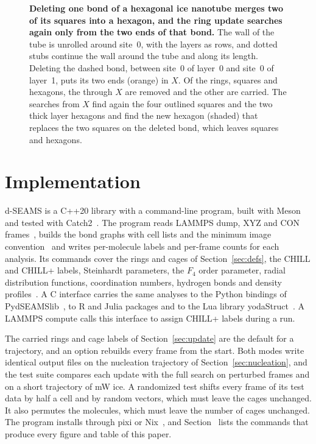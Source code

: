 \documentclass[preprint,12pt]{elsarticle}
\begin{document}
\begin{figure}[tbp]
\centering

\caption{\textbf{Deleting one bond of a hexagonal ice nanotube merges two of its squares into a hexagon, and the ring update searches again only from the two ends of that bond.}
The wall of the tube is unrolled around site~0, with the layers as rows, and dotted stubs continue the wall around the tube and along its length.
Deleting the dashed bond, between site~0 of layer~0 and site~0 of layer~1, puts its two ends (orange) in $X$.
Of the  rings,  squares and  hexagons, the  through $X$ are removed and the other  are carried.
The searches from $X$ find again the four outlined squares and the two thick layer hexagons and find the new hexagon (shaded) that replaces the two squares on the deleted bond, which leaves  squares and  hexagons.}
\label{fig:update}
\end{figure}

\section{Implementation}
\label{sec:impl}

d-SEAMS is a C++20 library with a command-line program, built with Meson~\cite{meson} and tested with Catch2~\cite{catch2}.
The program reads LAMMPS dump, XYZ and CON frames~\cite{thompson2022lammps}, builds the bond graphs with cell lists and the minimum image convention~\cite{goswami2026linkcell,goswami2026minimage} and writes per-molecule labels and per-frame counts for each analysis.
Its commands cover the rings and cages of Section~\ref{sec:defs}, the CHILL and CHILL+ labels, Steinhardt parameters, the $F_4$ order parameter, radial distribution functions, coordination numbers, hydrogen bonds and density profiles~\cite{steinhardt1983bond,moore2010chill,nguyen2015identification,rodger1996f4}.
A C interface carries the same analyses to the Python bindings of PydSEAMSlib~\cite{pydseamslib2026}, to R and Julia packages and to the Lua library yodaStruct~\cite{yodastruct2026}.
A LAMMPS compute calls this interface to assign CHILL+ labels during a run.

The carried rings and cage labels of Section~\ref{sec:update} are the default for a trajectory, and an option rebuilds every frame from the start.
Both modes write identical output files on the nucleation trajectory of Section~\ref{sec:nucleation}, and the test suite compares each update with the full search on perturbed frames and on a short trajectory of mW ice.
A randomized test shifts every frame of its test data by half a cell and by random vectors, which must leave the cages unchanged.
It also permutes the molecules, which must leave the number of cages unchanged.
The program installs through pixi or Nix~\cite{pixi,dolstra2004nix}, and Section~ lists the commands that produce every figure and table of this paper.
\end{document}
